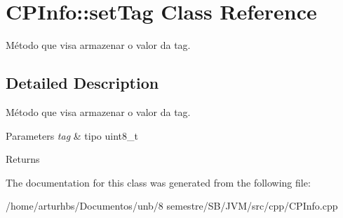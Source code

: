 \hypertarget{classCPInfo_1_1setTag}{}\section{C\+P\+Info\+:\+:set\+Tag Class Reference}
\label{classCPInfo_1_1setTag}


Método que visa armazenar o valor da tag.  




\subsection{Detailed Description}
Método que visa armazenar o valor da tag. 


\begin{DoxyParams}{Parameters}
{\em tag} & tipo uint8\+\_\+t \\
\hline
\end{DoxyParams}
\begin{DoxyReturn}{Returns}

\end{DoxyReturn}


The documentation for this class was generated from the following file\+:\begin{DoxyCompactItemize}
\item 
/home/arturhbs/\+Documentos/unb/8 semestre/\+S\+B/\+J\+V\+M/src/cpp/C\+P\+Info.\+cpp\end{DoxyCompactItemize}
